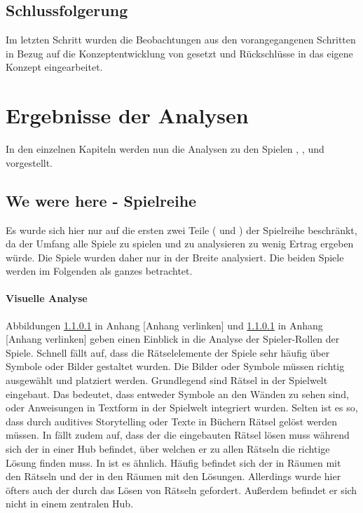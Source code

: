 \subsection{Schlussfolgerung}
Im letzten Schritt wurden die Beobachtungen aus den vorangegangenen Schritten in Bezug auf die Konzeptentwicklung von  gesetzt und Rückschlüsse in das eigene Konzept eingearbeitet.

\section{Ergebnisse der Analysen}
In den einzelnen Kapiteln werden nun die Analysen zu den Spielen , ,  und  vorgestellt.

\subsection{We were here - Spielreihe}
Es wurde sich hier nur auf die ersten zwei Teile ( und ) der Spielreihe beschränkt, da der Umfang alle Spiele zu spielen und zu analysieren zu wenig Ertrag ergeben würde. Die Spiele wurden daher nur in der Breite  analysiert. Die beiden Spiele werden im Folgenden als ganzes betrachtet.

\paragraph{Visuelle Analyse}
Abbildungen \ref{} in Anhang [Anhang verlinken] und \ref{} in Anhang [Anhang verlinken] geben einen Einblick in die Analyse der Spieler-Rollen der Spiele. Schnell fällt auf, dass die Rätselelemente der Spiele sehr häufig über Symbole oder Bilder gestaltet wurden. Die Bilder oder Symbole müssen richtig ausgewählt und platziert werden.  Grundlegend sind Rätsel in der Spielwelt eingebaut. Das bedeutet, dass entweder Symbole an den Wänden zu sehen sind, oder Anweisungen in Textform in der Spielwelt integriert wurden. Selten ist es so, dass durch auditives Storytelling oder Texte in Büchern Rätsel gelöst werden müssen. In  fällt zudem auf, dass der  die eingebauten Rätsel lösen muss während sich der  in einer Hub befindet, über welchen er zu allen Rätseln die richtige Lösung finden muss. In  ist es ähnlich. Häufig befindet sich der  in Räumen mit den Rätseln und der  in den Räumen mit den Lösungen. Allerdings wurde hier öfters auch der  durch das Lösen von Rätseln gefordert. Außerdem befindet er sich nicht in einem zentralen Hub.

